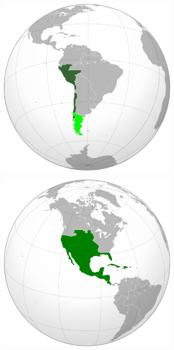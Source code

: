 \documentclass[10pt]{article}
\begin{document}
\begin{enumerate}
\begin{figure}[ht]
\begin{subfigure}{0.15\textwidth}
\includegraphics[width=\textwidth]{vice_peru.png}
\caption{\label{fig:1a}}
\end{subfigure}
\begin{subfigure}{0.15\textwidth}
\includegraphics[width=\textwidth]{vice_nuevaespana.png}

\end{subfigure}
\end{figure}
\end{enumerate}
\end{document}

